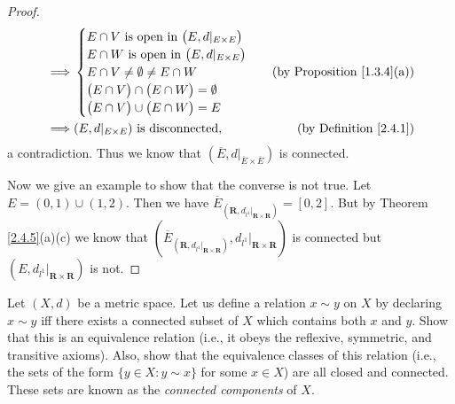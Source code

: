 \begin{proof}
\begin{align*}
        \implies & \begin{cases}
                       E \cap V \text{ is open in } \big(E, d|_{E \times E}\big) \\
                       E \cap W \text{ is open in } \big(E, d|_{E \times E}\big) \\
                       E \cap V \neq \emptyset \neq E \cap W                     \\
                       \big(E \cap V\big) \cap \big(E \cap W\big) = \emptyset    \\
                       \big(E \cap V\big) \cup \big(E \cap W\big) = E
                   \end{cases} & \text{(by Proposition \ref{1.3.4}(a))}                                                 \\
        \implies & (E, d|_{E \times E}) \text{ is disconnected},                & \text{(by Definition \ref{2.4.1})}
    \end{align*}
    a contradiction.
    Thus we know that \((\overline{E}, d|_{\overline{E} \times \overline{E}})\) is connected.

    Now we give an example to show that the converse is not true.
    Let \(E = (0, 1) \cup (1, 2)\).
    Then we have \(\overline{E}_{(\mathbf{R}, d_{l^1}|_{\mathbf{R} \times \mathbf{R}})} = [0, 2]\).
    But by Theorem \ref{2.4.5}(a)(c) we know that \((\overline{E}_{(\mathbf{R}, d_{l^1}|_{\mathbf{R} \times \mathbf{R}})}, d_{l^1}|_{\mathbf{R} \times \mathbf{R}})\) is connected but \((E, d_{l^1}|_{\mathbf{R} \times \mathbf{R}})\) is not.
\end{proof}

\begin{exercise}\label{ex 2.4.9}
    Let \((X, d)\) be a metric space. Let us define a relation \(x \sim y\) on \(X\) by declaring \(x \sim y\) iff there exists a connected subset of \(X\) which contains both \(x\) and \(y\).
    Show that this is an equivalence relation (i.e., it obeys the reflexive, symmetric, and transitive axioms).
    Also, show that the equivalence classes of this relation (i.e., the sets of the form \(\{y \in  X : y \sim x\}\) for some \(x \in X\)) are all closed and connected.
    These sets are known as the \emph{connected components} of \(X\).
\end{exercise}

